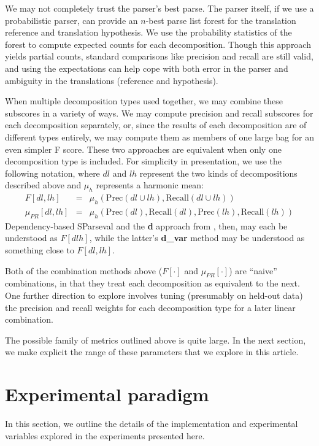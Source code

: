 \documentclass{kluwer}    %
\newcommand{\precision}[1]{\ensuremath{\textrm{Prec}\left(#1\right)}}
\newcommand{\recall}[1]{\ensuremath{\textrm{Recall}\left(#1\right)}}
\begin{document}
\begin{article}
We may not completely trust the parser's best parse.  The parser
itself, if we use a probabilistic parser, can provide an $n$-best
parse list forest for the translation reference and translation
hypothesis. We use the probability statistics of the forest to compute
expected counts for each decomposition. Though this approach yields
partial counts, standard comparisons like precision and recall are
still valid, and using the expectations can help cope with both error
in the parser and ambiguity in the translations (reference and
hypothesis).

When multiple decomposition types used together, we may combine these
subscores in a variety of ways.  We may compute precision and recall
subscores for each decomposition separately, or, since the results of
each decomposition are of different types entirely, we may compute
them as members of one large bag for an even simpler F score.  These
two approaches are equivalent when only one decomposition type is
included.  For simplicity in presentation, we use the following
notation, where $dl$ and $lh$ represent the two kinds of
decompositions described above and $\mu_h$ represents a harmonic mean:
\begin{eqnarray}
  \label{eq:fprmeans}
  F[dl,lh] & = &
  \mu_h \left( \precision{dl \cup lh},
    \recall{dl \cup lh} \right) \\
  \mu_{PR}[dl,lh]  & = & \mu_h \left( \precision{dl},
    \recall{dl}, \precision{lh}, \recall{lh} \right)    
\end{eqnarray}
Dependency-based SParseval and the \textbf{d} approach from
, then, may
each be understood as $F[dlh]$, while the latter's \textbf{d\_var}
method may be understood as something close to $F[dl,lh]$.

Both of the combination methods above ($F[\cdot]$ and
$\mu_{PR}[\cdot]$) are ``naive'' combinations, in that they treat each
decomposition as equivalent to the next.  One further direction to
explore involves tuning (presumably on held-out data) the precision
and recall weights for each decomposition type for a later linear
combination.

The possible family of metrics outlined above is quite large. In the
next section, we make explicit the range of these parameters that we
explore in this article.


\section{Experimental paradigm}
\label{sec:paradigm}
In this section, we outline the details of the implementation and
experimental variables explored in the experiments presented here.


\end{article}
\end{document}
